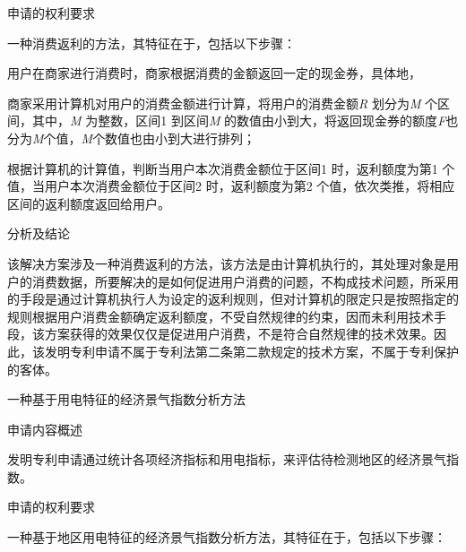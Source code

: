{\setlength{\parindent}{20.1bp}申请的权利要求\par}

{\setlength{\parindent}{20.6bp}一种消费返利的方法，其特征在于，包括以下步骤：\par}

{\setlength{\parindent}{20.6bp}用户在商家进行消费时，商家根据消费的金额返回一定的现金券，具体地，\par}

{\setlength{\parindent}{20.6bp}商家采用计算机对用户的消费金额进行计算，将用户的消费金额\textit{R} 划分为\textit{M} 个区间，其中，\textit{M} 为整数，区间1 到区间\textit{M} 的数值由小到大，将返回现金券的额度\textit{F}也分为\textit{M}个值，\textit{M}个数值也由小到大进行排列；\par}

{\setlength{\parindent}{20.6bp}根据计算机的计算值，判断当用户本次消费金额位于区间1 时，返利额度为第1 个值，当用户本次消费金额位于区间2 时，返利额度为第2 个值，依次类推，将相应区间的返利额度返回给用户。\par}

{\setlength{\parindent}{20.1bp}分析及结论\par}

{\setlength{\parindent}{20.6bp}该解决方案涉及一种消费返利的方法，该方法是由计算机执行的，其处理对象是用户的消费数据，所要解决的是如何促进用户消费的问题，不构成技术问题，所采用的手段是通过计算机执行人为设定的返利规则，但对计算机的限定只是按照指定的规则根据用户消费金额确定返利额度，不受自然规律的约束，因而未利用技术手段，该方案获得的效果仅仅是促进用户消费，不是符合自然规律的技术效果。因此，该发明专利申请不属于专利法第二条第二款规定的技术方案，不属于专利保护的客体。\par}

{\setlength{\parindent}{15.3bp}\par}

{\setlength{\parindent}{20.6bp}一种基于用电特征的经济景气指数分析方法\par}

{\setlength{\parindent}{20.1bp}申请内容概述\par}

{\setlength{\parindent}{20.6bp}发明专利申请通过统计各项经济指标和用电指标，来评估待检测地区的经济景气指数。\par}

{\setlength{\parindent}{20.1bp}申请的权利要求\par}

{\setlength{\parindent}{20.6bp}一种基于地区用电特征的经济景气指数分析方法，其特征在于，包括以下步骤：\par}

